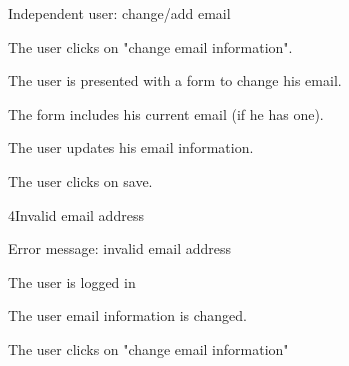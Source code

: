 \begin{uc}{Independent user: change/add email}

    \begin{uc-mss}
    \item The user clicks on "change email information".
    \item The user is presented with a form to change his email.
    \item The form includes his current email (if he has one).
    \item The user updates his email information. 
    \item The user clicks on save.
    \end{uc-mss}

    \begin{uc-ext}

        \begin{uc-fail}{4}{Invalid email address}
        \item Error message: invalid email address
        \item {}
        \end{uc-fail}

    \end{uc-ext}

    \begin{uc-pre}
    \item The user is logged in
    \end{uc-pre}

    \begin{uc-post}
    \item The user email information is changed.
    \end{uc-post}

    \begin{uc-trig}
    \item The user clicks on "change email information"
    \end{uc-trig}

\end{uc}